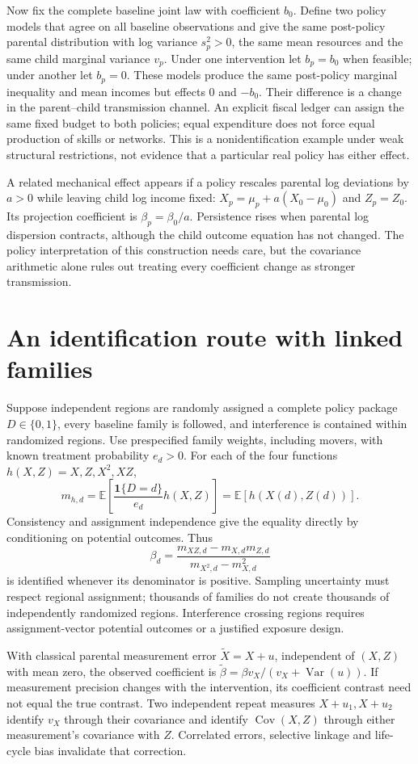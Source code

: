 \documentclass[11pt]{article}
\newcommand{\E}{\mathbb E}
\newcommand{\Var}{\operatorname{Var}}
\newcommand{\Cov}{\operatorname{Cov}}
\begin{document}
Now fix the complete baseline joint law with coefficient $b_0$. Define two policy models that agree on all baseline observations and give the same post-policy parental distribution with log variance $s_p^2>0$, the same mean resources and the same child marginal variance $v_p$. Under one intervention let $b_p=b_0$ when feasible; under another let $b_p=0$. These models produce the same post-policy marginal inequality and mean incomes but effects $0$ and $-b_0$. Their difference is a change in the parent--child transmission channel. An explicit fiscal ledger can assign the same fixed budget to both policies; equal expenditure does not force equal production of skills or networks. This is a nonidentification example under weak structural restrictions, not evidence that a particular real policy has either effect.

A related mechanical effect appears if a policy rescales parental log deviations by $a>0$ while leaving child log income fixed: $X_p=\mu_p+a(X_0-\mu_0)$ and $Z_p=Z_0$. Its projection coefficient is $\beta_p=\beta_0/a$. Persistence rises when parental log dispersion contracts, although the child outcome equation has not changed. The policy interpretation of this construction needs care, but the covariance arithmetic alone rules out treating every coefficient change as stronger transmission.

\section*{An identification route with linked families}
Suppose independent regions are randomly assigned a complete policy package $D\in\{0,1\}$, every baseline family is followed, and interference is contained within randomized regions. Use prespecified family weights, including movers, with known treatment probability $e_d>0$. For each of the four functions $h(X,Z)=X,Z,X^2,XZ$,
\[
 m_{h,d}=\E\!\left[\frac{\mathbf1\{D=d\}}{e_d}h(X,Z)\right]
       =\E[h(X(d),Z(d))].
\]
Consistency and assignment independence give the equality directly by conditioning on potential outcomes. Thus
\[
 \beta_d=\frac{m_{XZ,d}-m_{X,d}m_{Z,d}}
 {m_{X^2,d}-m_{X,d}^2}
\]
is identified whenever its denominator is positive. Sampling uncertainty must respect regional assignment; thousands of families do not create thousands of independently randomized regions. Interference crossing regions requires assignment-vector potential outcomes or a justified exposure design.

With classical parental measurement error $\widetilde X=X+u$, independent of $(X,Z)$ with mean zero, the observed coefficient is
$\widetilde\beta=\beta v_X/(v_X+\Var(u))$. If measurement precision changes with the intervention, its coefficient contrast need not equal the true contrast. Two independent repeat measures $X+u_1,X+u_2$ identify $v_X$ through their covariance and identify $\Cov(X,Z)$ through either measurement's covariance with $Z$. Correlated errors, selective linkage and life-cycle bias invalidate that correction.
\end{document}
